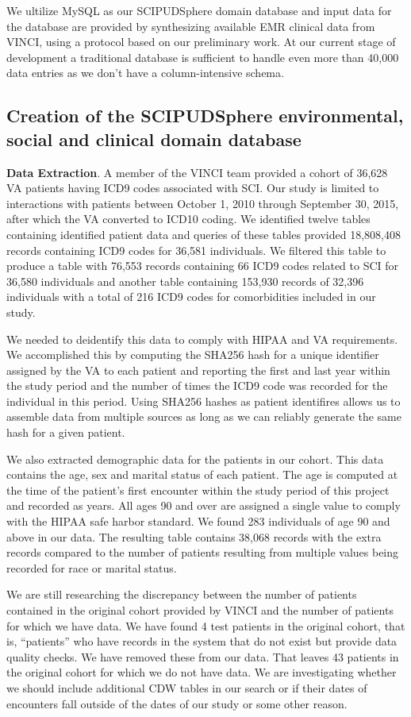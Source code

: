 \documentclass{amia}
\begin{document}
We ultilize MySQL as our SCIPUDSphere domain database and input data for the database are provided by synthesizing available EMR clinical data from VINCI, using a protocol based on our preliminary work. At our current stage of development a traditional database is sufficient to handle even more than 40,000 data entries as we don't have a column-intensive schema.

\subsection{Creation of the SCIPUDSphere environmental, social and clinical domain database}
{\bf Data Extraction}. A member of the VINCI team provided a cohort of 36,628 VA patients having ICD9 codes associated with SCI. Our study is limited to interactions with patients between October 1, 2010 through September 30, 2015, after which the VA converted to ICD10 coding. We identified twelve tables containing identified patient data and queries of these tables provided 18,808,408 records containing ICD9 codes for 36,581 individuals.  We filtered this table to produce a table with 76,553 records containing 66 ICD9 codes related to SCI for 36,580 individuals and another table containing 153,930 records of 32,396 individuals with a total of 216 ICD9 codes for comorbidities included in our study.

We needed to deidentify this data to comply with HIPAA and VA requirements.  We accomplished this by computing the SHA256 hash for a unique identifier assigned by the VA to each patient and reporting the first and last year within the study period and the number of times the ICD9 code was recorded for the individual in this period.  Using SHA256 hashes as patient identifires allows us to assemble data from multiple sources as long as we can reliably generate the same hash for a given patient.

We also extracted demographic data for the patients in our cohort.  This data contains the age, sex and marital status of each patient. The age is computed at the time of the patient's first encounter within the study period of this project and recorded as years. All ages 90 and over are assigned a single value to comply with the HIPAA safe harbor standard.  We found 283 individuals of age 90 and above in our data. The resulting table contains 38,068 records with the extra records compared to the number of patients resulting from multiple values being recorded for race or marital status.

We are still researching the discrepancy between the number of patients contained in the original cohort provided by VINCI and the number of patients for which we have data.  We have found 4 test patients in the original cohort, that is, ``patients'' who have records in the system that do not exist but provide data quality checks.  We have removed these from our data.  That leaves 43 patients in the original cohort for which we do not have data.  We are investigating whether we should include additional CDW tables in our search or if their dates of encounters fall outside of the dates of our study or some other reason.
\end{document}

